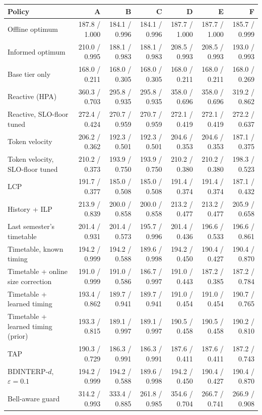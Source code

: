 \begin{tabular}{@{}lrrrrrr@{}}
\toprule
Policy & A & B & C & D & E & F \\
\midrule
Offline optimum & 187.8 / 1.000 & 184.1 / 0.996 & 184.1 / 0.996 & 187.7 / 1.000 & 187.7 / 1.000 & 185.7 / 0.999 \\
Informed optimum & 210.0 / 0.995 & 188.1 / 0.983 & 188.1 / 0.983 & 208.5 / 0.993 & 208.5 / 0.993 & 193.0 / 0.993 \\
Base tier only & 168.0 / 0.211 & 168.0 / 0.305 & 168.0 / 0.305 & 168.0 / 0.211 & 168.0 / 0.211 & 168.0 / 0.269 \\
Reactive (HPA) & 360.3 / 0.703 & 295.8 / 0.935 & 295.8 / 0.935 & 358.0 / 0.696 & 358.0 / 0.696 & 319.2 / 0.862 \\
Reactive, SLO-floor tuned & 272.4 / 0.424 & 270.7 / 0.959 & 270.7 / 0.959 & 272.1 / 0.419 & 272.1 / 0.419 & 272.2 / 0.637 \\
Token velocity & 206.2 / 0.362 & 192.3 / 0.501 & 192.3 / 0.501 & 204.6 / 0.353 & 204.6 / 0.353 & 187.1 / 0.375 \\
Token velocity, SLO-floor tuned & 210.2 / 0.373 & 193.9 / 0.750 & 193.9 / 0.750 & 210.2 / 0.380 & 210.2 / 0.380 & 198.3 / 0.523 \\
LCP & 191.7 / 0.377 & 185.0 / 0.508 & 185.0 / 0.508 & 191.4 / 0.374 & 191.4 / 0.374 & 187.1 / 0.432 \\
History + ILP & 213.9 / 0.839 & 200.0 / 0.858 & 200.0 / 0.858 & 213.2 / 0.477 & 213.2 / 0.477 & 205.9 / 0.658 \\
Last semester's timetable & 201.4 / 0.931 & 201.4 / 0.573 & 195.7 / 0.996 & 201.4 / 0.436 & 196.6 / 0.533 & 196.6 / 0.861 \\
Timetable, known timing & 194.2 / 0.999 & 194.2 / 0.588 & 189.6 / 0.998 & 194.2 / 0.450 & 190.4 / 0.427 & 190.4 / 0.870 \\
Timetable + online size correction & 191.0 / 0.999 & 191.0 / 0.586 & 186.7 / 0.997 & 191.0 / 0.443 & 187.2 / 0.385 & 187.2 / 0.784 \\
Timetable + learned timing & 193.4 / 0.862 & 189.7 / 0.941 & 189.7 / 0.941 & 191.0 / 0.454 & 191.0 / 0.454 & 190.7 / 0.765 \\
Timetable + learned timing (prior) & 193.3 / 0.815 & 189.1 / 0.997 & 189.1 / 0.997 & 190.5 / 0.458 & 190.5 / 0.458 & 190.2 / 0.810 \\
TAP & 190.3 / 0.729 & 186.3 / 0.991 & 186.3 / 0.991 & 187.6 / 0.411 & 187.6 / 0.411 & 187.2 / 0.743 \\
BDINTERP-$d$, $\varepsilon=0.1$ & 194.2 / 0.999 & 194.2 / 0.588 & 189.6 / 0.998 & 194.2 / 0.450 & 190.4 / 0.427 & 190.4 / 0.870 \\
Bell-aware guard & 314.2 / 0.993 & 333.4 / 0.885 & 261.8 / 0.985 & 354.6 / 0.704 & 266.7 / 0.741 & 266.9 / 0.908 \\
\bottomrule
\end{tabular}
